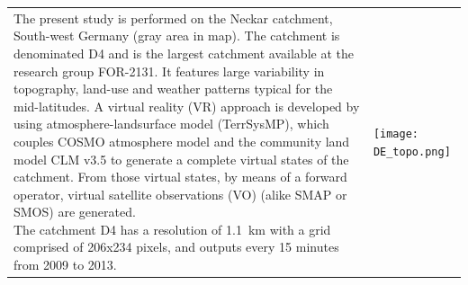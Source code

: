 \documentclass[landscape,paperwidth=1189mm,paperheight=841mm,fontscale=0.4,margin=.7cm]{baposter}
\begin{document}
\begin{poster}
{    \begin{tabular}{l|l} %
      \hspace{-1.5em}      
      \parbox[l]{0.5\linewidth}{   \vspace{-.5em}
        {The present study is performed on the Neckar catchment, South-west Germany (gray area in map). The catchment is denominated D4 and is the largest catchment available at the research group FOR-2131. It features large variability in topography, land-use and weather patterns typical for the mid-latitudes. A virtual reality (VR) approach is developed by using atmosphere-landsurface model (TerrSysMP), which couples COSMO atmosphere model and the community land model CLM v3.5 to generate a complete virtual states of the catchment. From those virtual states, by means of a forward operator, virtual satellite observations (VO) (alike SMAP or SMOS) are generated.}\\
    {The catchment D4 has a resolution of 1.1~km with a grid comprised of 206x234 pixels, and outputs every 15 minutes from 2009 to 2013.}    
      }
      &
      \begin{minipage}{0.5\linewidth}
	\vspace{-0.4em}	
        \begin{center}             
  		\texttt{[image: DE\_topo.png]}
      	\end{center}
      \end{minipage}
    \end{tabular}
  }

\end{poster}
\end{document}

